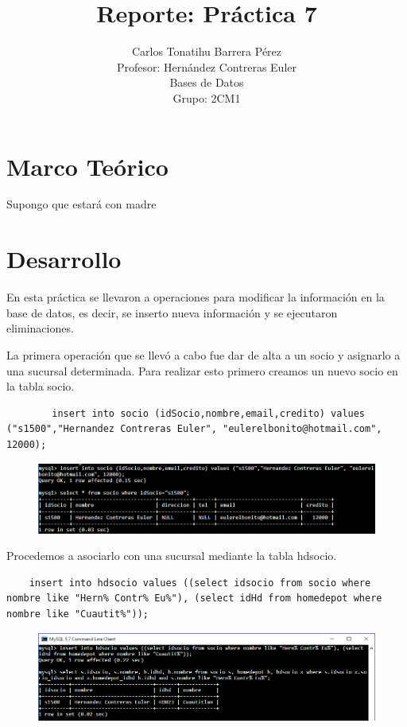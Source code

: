 \documentclass[12pt, titlepage]{article}
\title{Reporte: Práctica 7}
\author{Carlos Tonatihu Barrera Pérez \\ Profesor: Hernández Contreras Euler \\ Bases de Datos \\ Grupo: 2CM1 }
\begin{document}
	\maketitle
	\tableofcontents
	\section{Marco Teórico}
	Supongo que estará con madre
	\section{Desarrollo}
	En esta práctica se llevaron a operaciones para modificar la información en la base de datos, es decir, se inserto nueva información y se ejecutaron eliminaciones.
	
	La primera operación que se llevó a cabo fue dar de alta a un socio y asignarlo a una sucursal determinada. Para realizar esto primero creamos un nuevo socio en la tabla socio. 
	\begin{lstlisting}
		insert into socio (idSocio,nombre,email,credito) values ("s1500","Hernandez Contreras Euler", "eulerelbonito@hotmail.com", 12000);
	\end{lstlisting}
	\begin{figure}[H]
		\begin{center}
			\includegraphics[width=\textwidth]{img/uno.png}
			\label{fig:uno}
		\end{center}
	\end{figure}
	Procedemos a asociarlo con una sucursal mediante la tabla hdsocio.
	\begin{lstlisting}
	insert into hdsocio values ((select idsocio from socio where nombre like "Hern% Contr% Eu%"), (select idHd from homedepot where nombre like "Cuautit%"));
	\end{lstlisting}
	\begin{figure}[H]
		\begin{center}
			\includegraphics[width=\textwidth]{img/dos.png}
			\label{fig:dos}
		\end{center}
	\end{figure}
	
\end{document}
